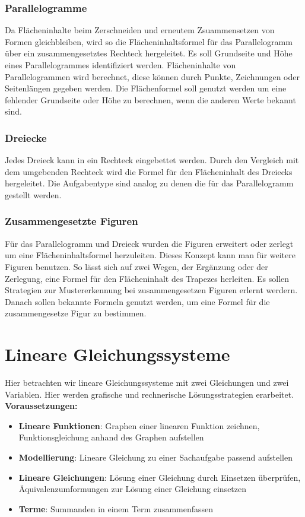 \documentclass{article}
\begin{document}
\subsubsection*{Parallelogramme}
Da Flächeninhalte beim Zerschneiden und erneutem Zsuammensetzen von Formen gleichbleiben, wird so die Flächeninhaltsformel für das Parallelogramm  über ein zusammengesetztes Rechteck hergeleitet.
Es soll Grundseite und Höhe eines Parallelogrammes identifiziert werden. Flächeninhalte von Parallelogrammen wird berechnet, diese können durch Punkte, Zeichnungen oder Seitenlängen gegeben werden. 
Die Flächenformel soll genutzt werden um eine fehlender Grundseite oder Höhe zu berechnen, wenn die anderen Werte bekannt sind.
\subsubsection*{Dreiecke}
Jedes Dreieck kann in ein Rechteck eingebettet werden. Durch den Vergleich mit dem umgebenden Rechteck wird die Formel für den Flächeninhalt des Dreiecks hergeleitet.
Die Aufgabentype sind analog zu denen die für das Parallelogramm gestellt werden.
\subsubsection*{Zusammengesetzte Figuren}
Für das Parallelogramm und Dreieck wurden die Figuren erweitert oder zerlegt um eine Flächeninhaltsformel herzuleiten. Dieses Konzept kann man für weitere Figuren benutzen.
So lässt sich auf zwei Wegen, der Ergänzung oder der Zerlegung, eine Formel für den Flächeninhalt des Trapezes herleiten.
Es sollen Strategien zur Mustererkennung bei zusammengesetzen Figuren erlernt werdern. 
Danach sollen bekannte Formeln genutzt werden, um eine Formel für die zusammengesetze Figur zu bestimmen.
\newpage
\section{Lineare Gleichungssysteme}
Hier betrachten wir lineare Gleichungssysteme mit zwei Gleichungen und zwei Variablen.
Hier werden grafische und rechnerische Lösungsstrategien erarbeitet.\\
\textbf{Voraussetzungen: }
\begin{itemize}
    \item \textbf{Lineare Funktionen}: Graphen einer linearen Funktion zeichnen, Funktionsgleichung anhand des Graphen aufstellen
    \item \textbf{Modellierung}: Lineare Gleichung zu einer Sachaufgabe passend aufstellen
    \item \textbf{Lineare Gleichungen}: Lösung einer Gleichung durch Einsetzen überprüfen, Äquivalenzumformungen zur Lösung einer Gleichung einsetzen
    \item \textbf{Terme}: Summanden in einem Term zusammenfassen
\end{itemize}
\end{document}
